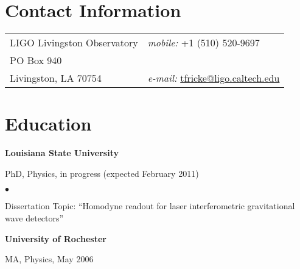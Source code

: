 \documentclass[margin,line]{res}
\newenvironment{list1}{
  \begin{list}{\ding{113}}{%
      \setlength{\itemsep}{0in}
      \setlength{\parsep}{0in} \setlength{\parskip}{0in}
      \setlength{\topsep}{0in} \setlength{\partopsep}{0in} 
      \setlength{\leftmargin}{0.17in}}}{\end{list}}
\newenvironment{list2}{
  \begin{list}{$\bullet$}{%
      \setlength{\itemsep}{0in}
      \setlength{\parsep}{0in} \setlength{\parskip}{0in}
      \setlength{\topsep}{0in} \setlength{\partopsep}{0in} 
      \setlength{\leftmargin}{0.2in}}}{\end{list}}
\begin{document}

\begin{resume}
\section{\sc Contact Information}
\vspace{.05in}
\begin{tabular}{@{}p{3.5in}p{3.5in}}
LIGO Livingston Observatory             & {\it mobile:}  +1 (510) 520-9697\\
PO Box 940                              & \\
Livingston, LA 70754                    & {\it e-mail:}  \href{mailto:tfricke@ligo.caltech.edu}{tfricke@ligo.caltech.edu}
\end{tabular}



\section{\sc Education}
{\bf Louisiana State University}\\
\vspace*{-.1in}
\begin{list1}
\item[] {\sc PhD}, Physics, in progress (expected February 2011) 
\begin{list2}
\item[] Dissertation Topic:  ``Homodyne readout for laser interferometric gravitational wave detectors''
\end{list2}
\end{list1}

{\bf University of Rochester}\\
\vspace*{-.1in}
\begin{list1}
\item[] {\sc MA}, Physics, May 2006
\end{list1}


\end{resume}
\end{document}
